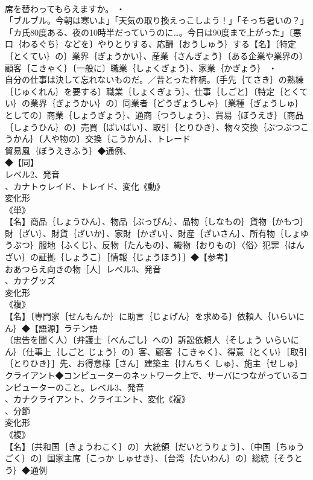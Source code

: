 \documentclass[8pt]{extreport}
\begin{document}
\begin{CJK}{UTF8}{min}
\\	席を替わってもらえますか。 ・
\\	「ブルブル。今朝は寒いよ」「天気の取り換えっこしよう！」「そっち暑いの？」「カ氏80度ある、夜の10時半だっていうのに…。今日は90度まで上がった」〔悪口｛わるぐち｝などを〕やりとりする、応酬｛おうしゅう｝する【名】〔特定｛とくてい｝の〕業界｛ぎょうかい｝、産業｛さんぎょう｝〔ある企業や業界の〕顧客｛こきゃく｝〔一般に〕職業｛しょくぎょう｝、家業｛かぎょう｝ ・
\\	自分の仕事は決して忘れないものだ。／昔とった杵柄。〔手先｛てさき｝の熟練｛じゅくれん｝を要する〕職業｛しょくぎょう｝、仕事｛しごと｝〔特定｛とくてい｝の業界｛ぎょうかい｝の〕同業者｛どうぎょうしゃ｝〔業種｛ぎょうしゅ｝としての〕商業｛しょうぎょう｝、通商｛つうしょう｝、貿易｛ぼうえき｝〔商品｛しょうひん｝の〕売買｛ばいばい｝、取引｛とりひき｝、物々交換｛ぶつぶつこうかん｝〔人や物の〕交換｛こうかん｝、トレード
\\	貿易風｛ぼうえきふう｝◆通例、
\\	◆【同】
\\	レベル2、発音
\\	、カナトゥレイド、トレイド、変化《動》
\\	変化形 
\\	《単》
\\	【名】商品｛しょうひん｝、物品｛ぶっぴん｝、品物｛しなもの｝貨物｛かもつ｝財｛ざい｝、財貨｛ざいか｝、家財｛かざい｝、財産｛ざいさん｝、所有物｛しょゆうぶつ｝服地｛ふくじ｝、反物｛たんもの｝、織物｛おりもの｝〈俗〉犯罪｛はんざい｝の証拠｛しょうこ｝［情報｛じょうほう｝］◆【参考】
\\	おあつらえ向きの物［人］レベル3、発音
\\	、カナグッズ
\\	変化形 
\\	《複》
\\	【名】〔専門家｛せんもんか｝に助言｛じょげん｝を求める〕依頼人｛いらいにん｝◆【語源】ラテン語
\\	（忠告を聞く人）〔弁護士｛べんごし｝への〕訴訟依頼人｛そしょう いらいにん｝〔仕事上｛しごと じょう｝の〕客、顧客｛こきゃく｝、得意｛とくい｝［取引｛とりひき｝］先、お得意様［さん］建築主｛けんちく しゅ｝、施主｛せしゅ｝クライアント◆コンピューターのネットワーク上で、サーバにつながっているコンピューターのこと。レベル3、発音
\\	、カナクライアント、クライエント、変化《複》
\\	、分節
\\	変化形 
\\	《複》
\\	【名】〔共和国｛きょうわこく｝の〕大統領｛だいとうりょう｝、〔中国｛ちゅうごく｝の〕国家主席｛こっか しゅせき｝、〔台湾｛たいわん｝の〕総統｛そうとう｝◆通例

\end{CJK}
\end{document}
